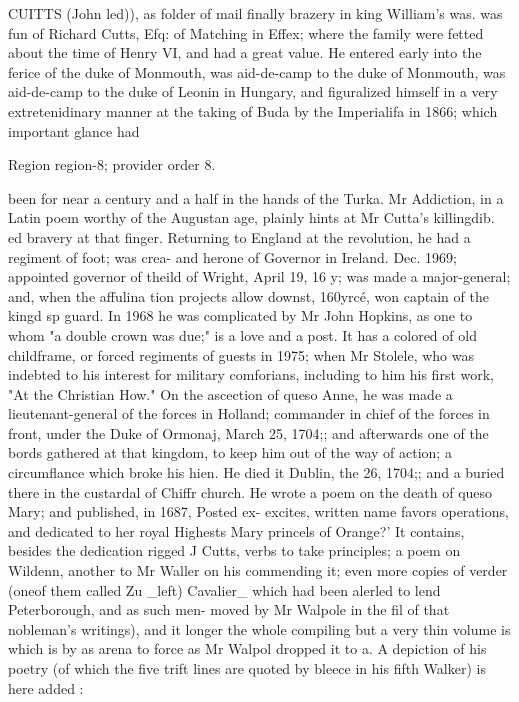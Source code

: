 \documentclass[11pt]{article}
\begin{document}
CUITTS (John led)), as folder of mail finally brazery in king William's was. was fun of Richard Cutts, Efq: of Matching in Effex; where the family were fetted about the time of Henry VI, and had a great value. He entered early into the ferice of the duke of Monmouth, was aid-de-camp to the duke of Monmouth, was aid-de-camp to the duke of Leonin in Hungary, and figuralized himself in a very extretenidinary manner at the taking of Buda by the Imperialifa in 1866; which important glance had
\par

{\scriptsize\color{gray} Region region-8; provider order 8.\par}
\medskip

been for near a century and a half in the hands of the Turka. Mr Addiction, in a Latin poem worthy of the Augustan age, plainly hints at Mr Cutta’s killingdib. ed bravery at that finger. Returning to England at the revolution, he had a regiment of foot; was crea- and herone of Governor in Ireland. Dec. 1969; appointed governor of theild of Wright, April 19, 16 y; was made a major-general; and, when the affulina tion projects allow downst, 160yrcé, won captain of the kingd sp guard. In 1968 he was complicated by Mr John Hopkins, as one to whom "a double crown was due;" is a love and a post. It has a colored of old childframe, or forced regiments of guests in 1975; when Mr Stolele, who was indebted to his interest for military comforians, including to him his first work, "At the Christian How." On the ascection of queso Anne, he was made a lieutenant-general of the forces in Holland; commander in chief of the forces in front, under the Duke of Ormonaj, March 25, 1704;; and afterwards one of the bords gathered at that kingdom, to keep him out of the way of action; a circumflance which broke his hien. He died it Dublin, the 26, 1704;; and a buried there in the custardal of Chiffr church. He wrote a poem on the death of queso Mary; and published, in 1687, Posted ex- excites, written name favors operations, and dedicated to her royal Highests Mary princels of Orange?' It contains, besides the dedication rigged J Cutts, verbs to take principles; a poem on Wildenn, another to Mr Waller on his commending it; even more copies of verder (oneof them called Zu \_left) Cavalier\_ which had been alerled to lend Peterborough, and as such men- moved by Mr Walpole in the fil of that nobleman's writings), and it longer the whole compiling but a very thin volume is which is by as arena to force as Mr Walpol dropped it to a. A depiction of his poetry (of which the five trift lines are quoted by bleece in his fifth Walker) is here added :
\par
\end{document}
